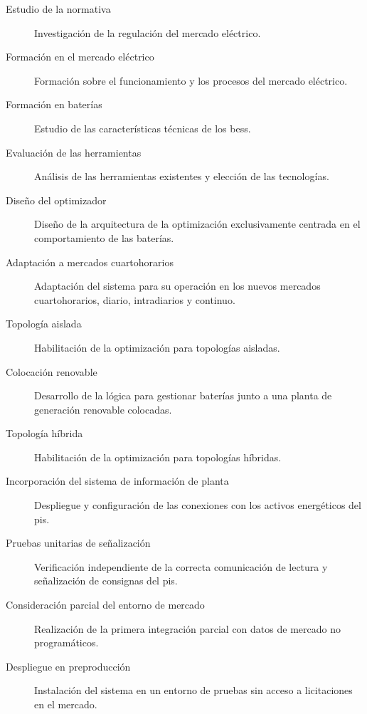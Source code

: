 \begin{description}

  \item[Estudio de la normativa] Investigación de la regulación del mercado eléctrico.

  \item[Formación en el mercado eléctrico] Formación sobre el funcionamiento y los procesos del mercado eléctrico.

  \item[Formación en baterías] Estudio de las características técnicas de los \gls{bess}.

  \item[Evaluación de las herramientas] Análisis de las herramientas existentes y elección de las tecnologías.

  \item[Diseño del optimizador] Diseño de la arquitectura de la optimización exclusivamente centrada en el comportamiento de las baterías.

  \item[Adaptación a mercados cuartohorarios] Adaptación del sistema para su operación en los nuevos mercados cuartohorarios, diario, intradiarios y continuo.

  \item[Topología aislada] Habilitación de la optimización para topologías aisladas.

  \item[Colocación renovable] Desarrollo de la lógica para gestionar baterías junto a una planta de generación renovable colocadas.

  \item[Topología híbrida] Habilitación de la optimización para topologías híbridas.

  \item[Incorporación del sistema de información de planta] Despliegue y configuración de las conexiones con los activos energéticos del \gls{pis}.

  \item[Pruebas unitarias de señalización] Verificación independiente de la correcta comunicación de lectura y señalización de consignas del \gls{pis}.

  \item[Consideración parcial del entorno de mercado] Realización de la primera integración parcial con datos de mercado no programáticos.

  \item[Despliegue en preproducción] Instalación del sistema en un entorno de pruebas sin acceso a licitaciones en el mercado.


\end{description}
